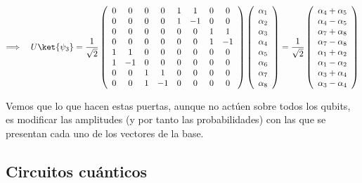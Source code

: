 \documentclass[11pt,a4paper,twoside,pdf]{article}
\numberwithin{equation}{section}
\begin{document}
				\begin{equation*} 
					\Longrightarrow \quad
					U \ket{\psi_3} = \frac{1}{\sqrt{2}}\left(\begin{array}{cccccccc}
					0 & 0 & 0 & 0 & 1 & 1 & 0 & 0\\
					0 & 0 & 0 & 0 & 1 & -1 & 0 & 0\\
					0 & 0 & 0 & 0 & 0 & 0 & 1 & 1\\
					0 & 0 & 0 & 0 & 0 & 0 & 1 & -1\\
					1 & 1 & 0 & 0 & 0 & 0 & 0 & 0\\
					1 & -1 & 0 & 0 & 0 & 0 & 0 & 0\\
					0 & 0 & 1 & 1 & 0 & 0 & 0 & 0\\
					0 & 0 & 1 & -1 & 0 & 0 & 0 & 0
					\end{array}\right)
					\left(\begin{array}{c}
					\alpha_{1}\\
					\alpha_{2}\\
					\alpha_{3}\\
					\alpha_{4}\\
					\alpha_{5}\\
					\alpha_{6}\\
					\alpha_{7}\\
					\alpha_{8}
					\end{array}\right) =
					\frac{1}{\sqrt{2}} \left(\begin{array}{c}
					\alpha_{4}+\alpha_{5}\\
					\alpha_{4}-\alpha_{5}\\
					\alpha_{7}+\alpha_{8}\\
					\alpha_{7}-\alpha_{8}\\
					\alpha_{1}+\alpha_{2}\\
					\alpha_{1}-\alpha_{2}\\
					\alpha_{3}+\alpha_{4}\\
					\alpha_{3}-\alpha_{4}
					\end{array}\right)
				\end{equation*}
			
			Vemos que lo que hacen estas puertas, aunque no actúen sobre todos los qubits, es modificar las amplitudes (y por tanto las probabilidades) con las que se presentan cada uno de los vectores de la base.
		
	\subsection{Circuitos cuánticos}
	
\end{document}
